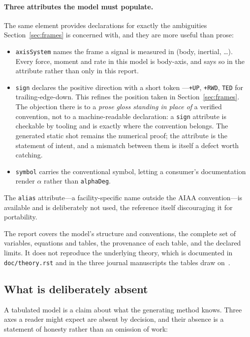 \documentclass[11pt,a4paper]{article}
\newcommand{\varid}[1]{\texttt{\small #1}}
\begin{document}
\paragraph{Three attributes the model must populate.} The same element
provides declarations for exactly the ambiguities
Section~\ref{sec:frames} is concerned with, and they are more useful than
prose:

\begin{itemize}
\item \texttt{axisSystem} names the frame a signal is measured in
(body, inertial, \ldots). Every force, moment and rate in this model is
body-axis, and says so in the attribute rather than only in this report.
\item \texttt{sign} declares the positive direction with a short token
---\texttt{+UP}, \texttt{+RWD}, \texttt{TED} for trailing-edge-down.
This refines the position taken in Section~\ref{sec:frames}. The
objection there is to a \emph{prose gloss standing in place of} a
verified convention, not to a machine-readable declaration: a
\texttt{sign} attribute is checkable by tooling and is exactly where the
convention belongs. The generated static shot remains the numerical
proof; the attribute is the statement of intent, and a mismatch between
them is itself a defect worth catching.
\item \texttt{symbol} carries the conventional symbol, letting a
consumer's documentation render $\alpha$ rather than
\varid{alphaDeg}.
\end{itemize}

\noindent
The \texttt{alias} attribute---a facility-specific name outside the AIAA
convention---is available and is deliberately not used, the reference
itself discouraging it for portability.

The report covers the model's structure and conventions, the complete
set of variables, equations and tables, the provenance of each table, and
the declared limits. It does not reproduce the underlying theory, which
is documented in \texttt{doc/theory.rst} and in the three journal
manuscripts the tables draw on~\cite{partone,parttwo,scitech}.

\subsection{What is deliberately absent}

A tabulated model is a claim about what the generating method knows.
Three axes a reader might expect are absent by decision, and their
absence is a statement of honesty rather than an omission of work:
\end{document}
